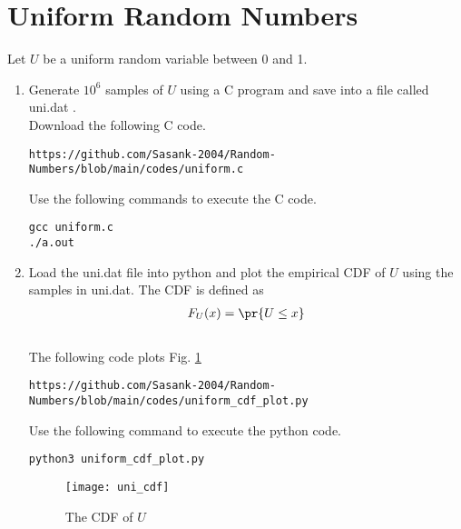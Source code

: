 \documentclass[journal,12pt,twocolumn]{IEEEtran}
\renewcommand\thesection{\arabic{section}}
\begin{document}
\section{Uniform Random Numbers}
Let $U$ be a uniform random variable between 0 and 1.
\begin{enumerate}[label=\thesection.\arabic*
,ref=\thesection.\theenumi]
\item Generate $10^6$ samples of $U$ using a C program and save into a file called uni.dat .
\\
\solution Download the following  C code.
\begin{lstlisting}
https://github.com/Sasank-2004/Random-Numbers/blob/main/codes/uniform.c 
\end{lstlisting}
Use the following commands to execute the C code.
\begin{lstlisting}
gcc uniform.c
./a.out 
\end{lstlisting}
%
\item
Load the uni.dat file into python and plot the empirical CDF of $U$ using the samples in uni.dat. The CDF is defined as
\begin{align}
F_{U}(x) = \pr{U \le x}
\end{align}
\\
\solution  The following code plots Fig. \ref{fig:uni_cdf}
\begin{lstlisting}
https://github.com/Sasank-2004/Random-Numbers/blob/main/codes/uniform_cdf_plot.py 
\end{lstlisting}
Use the following command to execute the python code.
\begin{lstlisting}
python3 uniform_cdf_plot.py
\end{lstlisting}
\begin{figure}[h]
\centering
\texttt{[image: uni\_cdf]}
\caption{The CDF of $U$}
\label{fig:uni_cdf}
\end{figure}


\end{enumerate}
\end{document}
